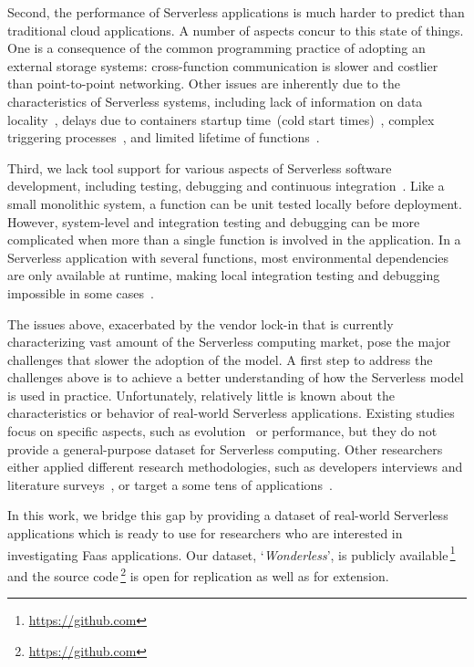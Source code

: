 Second, the performance of Serverless applications is much harder to 
predict than traditional cloud applications. A number of aspects concur 
to this state of things.
One is a consequence of the common programming practice
of adopting an external storage systems: cross-function communication 
is slower and costlier than point-to-point networking.
Other issues are inherently due to the characteristics of Serverless systems,
including lack of information on data locality~\cite{DBLP:journals/corr/abs-1902-03383},
delays due to containers startup time~(cold start times)~\cite{manner2018cold}, 
complex triggering processes~\cite{pelle2019towards}, and
limited lifetime of functions~\cite{hellerstein2018serverless}.

Third, we lack tool support for various aspects of
Serverless software development, including testing, debugging 
and continuous integration~\cite{lenarduzzi2020serverless, nupponen2020serverless}.
Like a small monolithic system, a function can be unit tested 
locally before deployment. 
However, system-level and integration testing and debugging can 
be more complicated when more than a single function is involved 
in the application. In a Serverless application with several functions, 
most environmental dependencies are only available at runtime, 
making local integration testing and debugging impossible in 
some cases~\cite{leitner2019mixed}.


The issues above, exacerbated by the vendor lock-in that is currently 
characterizing vast amount of the Serverless computing market, 
pose the major challenges that slower the adoption of the \faas model. 
A first step to address the challenges above is to achieve a 
better understanding of how the Serverless model is used in practice. 
Unfortunately, relatively little is known about the characteristics 
or behavior of real-world Serverless applications. Existing studies focus 
on specific aspects, such as evolution~\cite{spillner2019quantitative} 
or performance\cite{wang2018peeking,lloyd2018serverless},
but they do not provide a general-purpose dataset for Serverless computing.
Other researchers either applied different research methodologies, 
such as developers interviews and literature surveys~\cite{leitner2019mixed},
or target a some tens of applications~\cite{eismann2020serverless}.


In this work, we bridge this gap by providing a dataset of real-world Serverless 
applications which is ready to use for researchers who are interested in investigating
Faas applications. Our dataset, `\emph{Wonderless}', is publicly 
available\,\footnote{\url{https://github.com}} 
and the source code\,\footnote{\url{https://github.com}} 
is open for replication as well as for extension.











